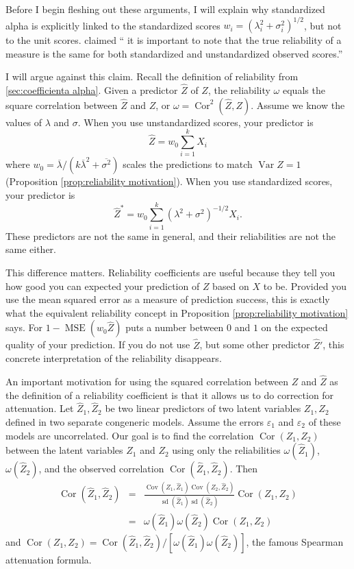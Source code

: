 \documentclass[twoside]{article}
\DeclareMathOperator{\Var}{Var}
\DeclareMathOperator{\sd}{sd}
\DeclareMathOperator{\Cor}{Cor}
\DeclareMathOperator{\Cov}{Cov}
\DeclareMathOperator{\MSE}{MSE}
\begin{document}
Before I begin fleshing out these arguments, I will explain why standardized alpha is explicitly linked to the standardized scores $w_i = (\lambda_i^2 + \sigma_i^2)^{1/2}$,  but not to the unit scores.  \citet[][p.348]{Osburn2000-jd} claimed
\enquote{\textelp{} it is important to note that the true reliability of a measure is the same for both standardized and unstandardized observed scores.}

I will argue against this claim. Recall the definition of reliability from
\cref{sec:coefficienta alpha}. Given a predictor $\hat{Z}$ of $Z$, the
reliability $\omega$ equals the square correlation between $\hat{Z}$
and $Z$, or $\omega=\Cor^{2}(\hat{Z},Z)$. Assume
we know the values of $\lambda$ and $\sigma$. When you use unstandardized
scores, your predictor is $$\hat{Z}=w_{0}\sum_{i=1}^{k}X_{i}$$
where $w_{0}=\overline{\lambda}/(k\overline{\lambda}^{2}+\overline{\sigma^{2}})$ scales the predictions to match $\Var Z=1$ (Proposition \ref{prop:reliability motivation}). When you use standardized
scores, your predictor is $$
\hat{Z}^{*}=w_{0}\sum_{i=1}^{k}(\lambda^{2}+\sigma^{2})^{-1/2}X_{i}.$$
These predictors are not the same in general, and their reliabilities are not
the same either.

This difference matters. Reliability coefficients are useful because they tell you how good you can expected your prediction of $Z$ based on $X$ to be. Provided you use the mean squared error as a measure of prediction success, this is exactly what the equivalent reliability concept in Proposition \ref{prop:reliability motivation} says. For $1 - \MSE(w_0\hat{Z})$ puts a number between $0$ and $1$ on the expected quality of your prediction. If you do not use $\hat{Z}$, but some other predictor $\hat{Z}'$, this concrete interpretation of the reliability disappears. 

An important motivation for using the squared
correlation between $Z$ and $\hat{Z}$ as the definition of a
reliability coefficient is that it allows us to do correction for
attenuation. Let $\hat{Z}_{1},\hat{Z}_{2}$ be two linear
predictors of two latent variables $Z_{1},Z_{2}$ defined in two separate
congeneric models. Assume the errors $\varepsilon_{1}$ and $\varepsilon_{2}$ of these models
are uncorrelated. Our goal is to find the correlation $\Cor(Z_{1},Z_{2})$
between the latent variables $Z_{1}$ and $Z_{2}$ using only the
reliabilities $\omega(\hat{Z}_{1})$, $\omega(\hat{Z}_{2})$,
and the observed correlation $\Cor(\hat{Z}_{1},\hat{Z}_{2})$.
Then
\begin{eqnarray*}
\Cor(\hat{Z}_{1},\hat{Z}_{2}) & = & \frac{\Cov(Z_{1},\hat{Z}_{1})\Cov(Z_{2},\hat{Z}_{2})}{\sd(\hat{Z}_{1})\sd(\hat{Z}_{2})}\Cor(Z_{1},Z_{2})\\
 & = & \omega(\hat{Z}_{1})\omega(\hat{Z}_{2})\Cor(Z_{1},Z_{2})
\end{eqnarray*}
and $\Cor(Z_{1},Z_{2})=\Cor(\hat{Z}_{1},\hat{Z}_{2})/[\omega(\hat{Z}_{1})\omega(\hat{Z}_{2})]$,
the famous Spearman \citet{spearman1904proof} attenuation formula.
\end{document}
